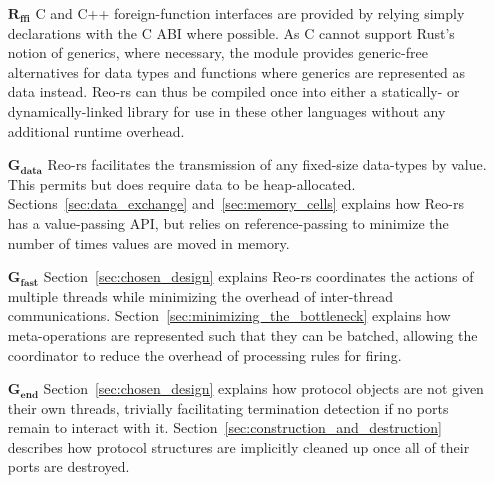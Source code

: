 \begin{enumerate}
	\item[$\boldsymbol{R_{ffi}}$] C and C++ foreign-function interfaces are provided by relying simply declarations with the C ABI where possible. As C cannot support Rust's notion of generics, where necessary, the  module provides generic-free alternatives for data types and functions where generics are represented as data instead. Reo-rs can thus be compiled once into either a statically- or dynamically-linked library for use in these other languages without any additional runtime overhead.
	
	\item[$\boldsymbol{G_{data}}$] Reo-rs facilitates the transmission of any fixed-size data-types by value. This permits but does require data to be heap-allocated. Sections~\ref{sec:data_exchange} and~\ref{sec:memory_cells} explains how Reo-rs has a value-passing API, but relies on reference-passing to minimize the number of times values are moved in memory.
	
	\item[$\boldsymbol{G_{fast}}$] Section~\ref{sec:chosen_design} explains Reo-rs coordinates the actions of multiple threads while minimizing the overhead of inter-thread communications. Section~\ref{sec:minimizing_the_bottleneck} explains how meta-operations are represented such that they can be batched, allowing the coordinator to reduce the overhead of processing rules for firing.
	
	\item[$\boldsymbol{G_{end}}$] Section~\ref{sec:chosen_design} explains how protocol objects are not given their own threads, trivially facilitating termination detection if no ports remain to interact with it. Section~\ref{sec:construction_and_destruction} describes how protocol structures are implicitly cleaned up once all of their ports are destroyed. 
\end{enumerate}